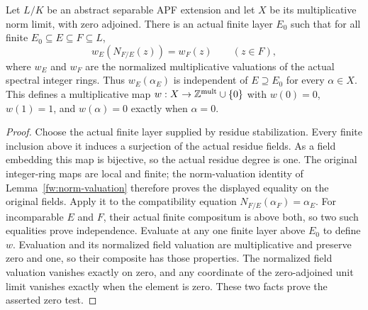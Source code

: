 \begin{lemma}
\label{fw:norm-limit-stable-valuation}
\leanok
Let $L/K$ be an abstract separable APF extension and let $X$ be its
multiplicative norm limit, with zero adjoined. There is an actual finite
layer $E_0$ such that for all finite $E_0\subseteq E\subseteq F\subseteq L$,
\[
 w_E(N_{F/E}(z))=w_F(z)\qquad(z\in F),
\]
where $w_E$ and $w_F$ are the normalized multiplicative valuations of
the actual spectral integer rings. Thus $w_E(\alpha_E)$ is independent
of $E\supseteq E_0$ for every $\alpha\in X$. This defines a
multiplicative map $w:X\to\mathbb Z^{\rm mult}\cup\{0\}$ with
$w(0)=0$, $w(1)=1$, and $w(\alpha)=0$ exactly when $\alpha=0$.
\end{lemma}
\begin{proof}
Choose the actual finite layer supplied by residue stabilization.
Every finite inclusion above it induces a surjection of the actual
residue fields. As a field embedding this map is bijective, so the
actual residue degree is one. The original integer-ring maps are
local and finite; the norm-valuation identity of
Lemma~\ref{fw:norm-valuation} therefore proves the displayed equality
on the original fields. Apply it to the compatibility equation
$N_{F/E}(\alpha_F)=\alpha_E$.
For incomparable $E$ and $F$, their actual finite compositum is
above both, so two such equalities prove independence. Evaluate at
any one finite layer above $E_0$ to define $w$. Evaluation and its
normalized field valuation are multiplicative and preserve zero
and one, so their composite has those properties. The normalized
field valuation vanishes exactly on zero, and any coordinate of
the zero-adjoined unit limit vanishes exactly when the element is
zero. These two facts prove the asserted zero test.
\end{proof}

